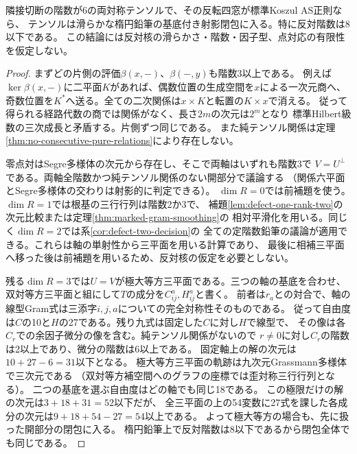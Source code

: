 \begin{theorem}[全ての両対称AS反転窓の閉包と階数上界]\label{thm:all-bisymmetric-as-closure}
隣接切断の階数が6の両対称テンソルで、その反転四窓が標準Koszul AS正則なら、
テンソルは滑らかな楕円鉛筆の基底付き射影閉包に入る。特に反対階数は8以下である。
この結論には反対核の滑らかさ・階数・因子型、点対応の有限性を仮定しない。
\end{theorem}
\begin{proof}
まずどの片側の評価$\beta(x,-)$、$\beta(-,y)$も階数3以上である。
例えば$\ker\beta(x,-)$に二平面$K$があれば、偶数位置の生成空間を$x$による一次元商へ、
奇数位置を$K^*$へ送る。全ての二次関係は$x\times K$と転置の$K\times x$で消える。
従って得られる経路代数の商では関係がなく、長さ$2m$の次元は$2^m$となり
標準Hilbert級数の三次成長と矛盾する。片側ずつ同じである。
また純テンソル関係は定理\ref{thm:no-consecutive-pure-relations}により存在しない。

零点対はSegre多様体の次元から存在し、そこで両軸はいずれも階数3で
$V=U^\perp$である。両軸全階数かつ純テンソル関係のない開部分で議論する
（関係六平面とSegre多様体の交わりは射影的に判定できる）。
$\dim R=0$では前補題を使う。$\dim R=1$では根基の三行行列は階数2か3で、
補題\ref{lem:defect-one-rank-two}の次元比較または定理\ref{thm:marked-gram-smoothing}の
相対平滑化を用いる。同じく$\dim R=2$では系\ref{cor:defect-two-decision}の
全ての定階数鉛筆の議論が適用できる。これらは軸の単射性から三平面を用いる計算であり、
最後に相補三平面へ移った後は前補題を用いるため、反対核の仮定を必要としない。

残る$\dim R=3$では$U=V$が極大等方三平面である。三つの軸の基底を合わせ、
双対等方三平面と組にして$T$の成分を$C_{ij}^a,H_{ij}^a$と書く。
前者は$r_a$との対合で、軸の線型Gram式は三添字$i,j,a$についての完全対称性そのものである。
従って自由度は$C$の10と$H$の27である。残り九式は固定した$C$に対し$H$で線型で、
その像は各$C_r$での余因子微分の像を含む。純テンソル関係がないので
$r\ne0$に対し$C_r$の階数は2以上であり、微分の階数は6以上である。
固定軸上の解の次元は$10+27-6=31$以下となる。
極大等方三平面の軌跡は九次元Grassmann多様体で三次元である
（双対等方補空間へのグラフの座標では歪対称三行行列となる）。
二つの基底を選ぶ自由度はどの軸でも同じ18である。
この極限だけの解の次元は$3+18+31=52$以下だが、
全三平面の上の54変数に27式を課した各成分の次元は$9+18+54-27=54$以上である。
よって極大等方の場合も、先に扱った開部分の閉包に入る。
楕円鉛筆上で反対階数は8以下であるから閉包全体でも同じである。
\end{proof}

